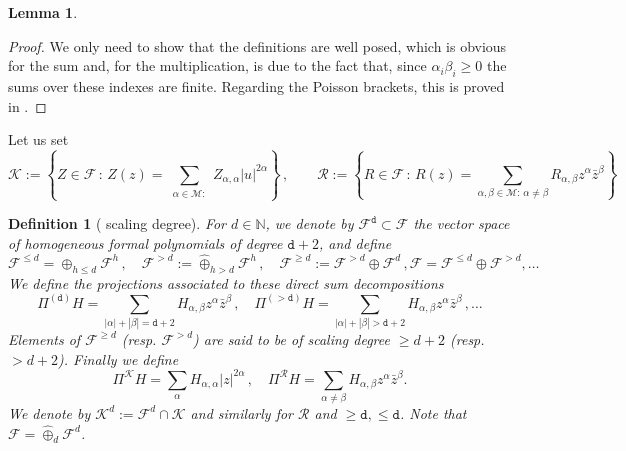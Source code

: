\documentclass[reqno,11pt]{amsart}
\theoremstyle{plain}
\numberwithin{equation}{section}
\newtheorem{lemma}[theorem]{Lemma}
\newtheorem{defn}[thm]{Definition}
\newcommand{\N}{\mathbb{N}}
\renewcommand{\ge}{\geq}
\newcommand{\cF}{{\mathcal F}}
\newcommand{\cM}{{\mathcal M}}
\newcommand{\cR}{{\mathcal R}}
\newcommand{\cK}{{\mathcal K}}
\newcommand{\td}{{\mathtt{d}}}
\newcommand{\al}{{\alpha}}
\newcommand{\bt}{{\beta}}
\renewcommand{\ge}{\gtrsim}
\begin{document}
{\begin{lemma}
\end{lemma}
\begin{proof}
	We only need to show that the definitions are  well posed, which is  obvious for the sum and, for the multiplication, is due to the fact that, since $\al_i\bt_i\geq 0$ the sums over these indexes are finite. Regarding the Poisson brackets, this is proved in \cite{ProcesiStolo}.
\end{proof}

Let us set
\begin{equation}\label{nocciolina}
	\cK:=\left\{Z\in \cF\, : \, Z(z) = \!\!\sum_{\substack{\al\in \cM:}} Z_{\al,\al}|u|^{2\al}\right\}\,,\qquad \cR:=\left\{R\in \cF\, : \, R(z) = \!\!\!\!\!\!\!\!\sum_{\al,\bt\in \cM:\, \al\ne \bt }\!\!\!\!\!\!\!\! R_{\al,\bt}z^\al\bar z^\bt\right\}
\end{equation}


\begin{defn}[ scaling degree]\label{scialla}
	For $d\in \N$, we denote by $\cF^\td\subset \cF$ the vector space of homogeneous formal polynomials of degree $\td+2$, and define 
	\[
	\cF^{\leq d}= \oplus_{h\leq d} \cF^{h}\,,\quad \cF^{>d}:=\widehat\oplus_{h>d} \cF^{h} \,,\quad  \cF^{\geq d}:= \cF^{>d}\oplus \cF^{d}\,,\cF =\cF^{\leq d}\oplus\cF^{> d},\dots
	\]
	We define the projections  associated to these direct sum decompositions
	\[
	\Pi^{(\td)} H= \sum_{|\al|+|\bt|=\td+2}H_{\al,\bt} z^\al\bar z^\bt \,,\quad \Pi^{(> \td)} H= \sum_{|\al|+|\bt|> \td+2}H_{\al,\bt} z^\al\bar z^\bt\,,\dots
	\]
	Elements of $\cF^{\geq d}$ (resp. $\cF^{> d}$) are said to be {\it of scaling degree} $\geq d+2$ (resp. $>d+2$).
	Finally we define
	\[
	\Pi^\cK H =  \sum_{\al}H_{\al,\al} |z|^{2\al}\,,\quad \Pi^\cR H = \sum_{\al\ne \bt}H_{\al,\bt} z^\al\bar z^\bt.
	\]
	We denote by $\cK^d:= \cF^d \cap \cK$  and similarly for $\cR$ and $\geq \td ,\leq \td$.
	Note that $\cF= \widehat \oplus_d \cF^d$.
\end{defn}

}
\end{document}
